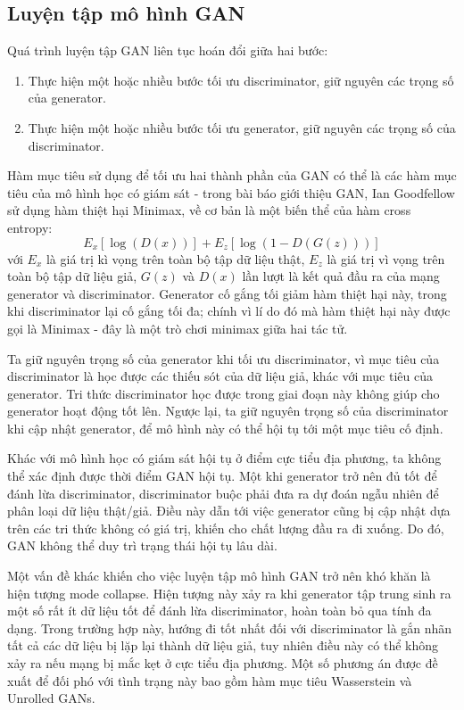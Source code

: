 \documentclass[12pt]{extreport}
\begin{document}
\subsection{Luyện tập mô hình GAN}
\label{gan}

Quá trình luyện tập GAN liên tục hoán đổi giữa hai bước:
\begin{enumerate}
    \item Thực hiện một hoặc nhiều bước tối ưu discriminator, giữ nguyên các trọng số của generator.
    \item Thực hiện một hoặc nhiều bước tối ưu generator, giữ nguyên các trọng số của discriminator.
\end{enumerate}

Hàm mục tiêu sử dụng để tối ưu hai thành phần của GAN có thể là các hàm mục tiêu của mô hình học có giám sát - trong bài báo giới thiệu GAN, Ian Goodfellow sử dụng hàm thiệt hại Minimax, về cơ bản là một biến thể của hàm cross entropy:
$$ E_x[\log(D(x))] + E_z[\log(1 - D(G(z)))] $$
với $ E_x $ là giá trị kì vọng trên toàn bộ tập dữ liệu thật, $ E_z $ là giá trị vì vọng trên toàn bộ tập dữ liệu giả, $ G(z) $ và $ D(x) $ lần lượt là kết quả đầu ra của mạng generator và discriminator. Generator cố gắng tối giảm hàm thiệt hại này, trong khi discriminator lại cố gắng tối đa; chính vì lí do đó mà hàm thiệt hại này được gọi là Minimax - đây là một trò chơi minimax giữa hai tác tử.

Ta giữ nguyên trọng số của generator khi tối ưu discriminator, vì mục tiêu của discriminator là học được các thiếu sót của dữ liệu giả, khác với mục tiêu của generator. Tri thức discriminator học được trong giai đoạn này không giúp cho generator hoạt động tốt lên. Ngược lại, ta giữ nguyên trọng số của discriminator khi cập nhật generator, để mô hình này có thể hội tụ tới một mục tiêu cố định.

Khác với mô hình học có giám sát hội tụ ở điểm cực tiểu địa phương, ta không thể xác định được thời điểm GAN hội tụ. Một khi generator trở nên đủ tốt để đánh lừa discriminator, discriminator buộc phải đưa ra dự đoán ngẫu nhiên để phân loại dữ liệu thật/giả. Điều này dẫn tới việc generator cũng bị cập nhật dựa trên các tri thức không có giá trị, khiến cho chất lượng đầu ra đi xuống. Do đó, GAN không thể duy trì trạng thái hội tụ lâu dài.

Một vấn đề khác khiến cho việc luyện tập mô hình GAN trở nên khó khăn là hiện tượng mode collapse. Hiện tượng này xảy ra khi generator tập trung sinh ra một số rất ít dữ liệu tốt để đánh lừa discriminator, hoàn toàn bỏ qua tính đa dạng. Trong trường hợp này, hướng đi tốt nhất đối với discriminator là gắn nhãn tất cả các dữ liệu bị lặp lại thành dữ liệu giả, tuy nhiên điều này có thể không xảy ra nếu mạng bị mắc kẹt ở cực tiểu địa phương. Một số phương án được đề xuất để đối phó với tình trạng này bao gồm hàm mục tiêu Wasserstein và Unrolled GANs.
\end{document}

